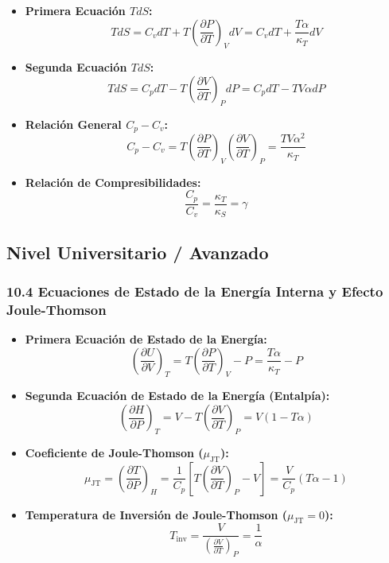 \documentclass[11pt,a4paper]{article}
\begin{document}
\begin{itemize}
  \item \textbf{Primera Ecuación $T dS$:}
  \[
    T dS = C_v dT + T \left( \frac{\partial P}{\partial T} \right)_V dV = C_v dT + \frac{T \alpha}{\kappa_T} dV
  \]
  \item \textbf{Segunda Ecuación $T dS$:}
  \[
    T dS = C_p dT - T \left( \frac{\partial V}{\partial T} \right)_P dP = C_p dT - T V \alpha dP
  \]
  \item \textbf{Relación General $C_p - C_v$:}
  \[
    C_p - C_v = T \left( \frac{\partial P}{\partial T} \right)_V \left( \frac{\partial V}{\partial T} \right)_P = \frac{T V \alpha^2}{\kappa_T}
  \]
  \item \textbf{Relación de Compresibilidades:}
  \[
    \frac{C_p}{C_v} = \frac{\kappa_T}{\kappa_S} = \gamma
  \]
\end{itemize}

\subsection*{Nivel Universitario / Avanzado}

\subsubsection*{10.4 Ecuaciones de Estado de la Energía Interna y Efecto Joule-Thomson}

\begin{itemize}
  \item \textbf{Primera Ecuación de Estado de la Energía:}
  \[
    \left( \frac{\partial U}{\partial V} \right)_T = T \left( \frac{\partial P}{\partial T} \right)_V - P = \frac{T \alpha}{\kappa_T} - P
  \]
  \item \textbf{Segunda Ecuación de Estado de la Energía (Entalpía):}
  \[
    \left( \frac{\partial H}{\partial P} \right)_T = V - T \left( \frac{\partial V}{\partial T} \right)_P = V(1 - T\alpha)
  \]
  \item \textbf{Coeficiente de Joule-Thomson ($\mu_{\text{JT}}$):}
  \[
    \mu_{\text{JT}} = \left( \frac{\partial T}{\partial P} \right)_H = \frac{1}{C_p} \left[ T \left( \frac{\partial V}{\partial T} \right)_P - V \right] = \frac{V}{C_p}(T\alpha - 1)
  \]
  \item \textbf{Temperatura de Inversión de Joule-Thomson ($\mu_{\text{JT}} = 0$):}
  \[
    T_{\text{inv}} = \frac{V}{\left( \frac{\partial V}{\partial T} \right)_P} = \frac{1}{\alpha}
  \]
\end{itemize}
\end{document}
